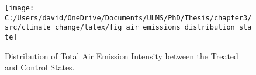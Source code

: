 \begin{figure}[H]
    \centering
    \texttt{[image: C:/Users/david/OneDrive/Documents/ULMS/PhD/Thesis/chapter3/src/climate\_change/latex/fig\_air\_emissions\_distribution\_state]}
    \caption{Distribution of Total Air Emission Intensity between the Treated and Control States.}
    \label{fig:air-emissions-distribution}
\end{figure}